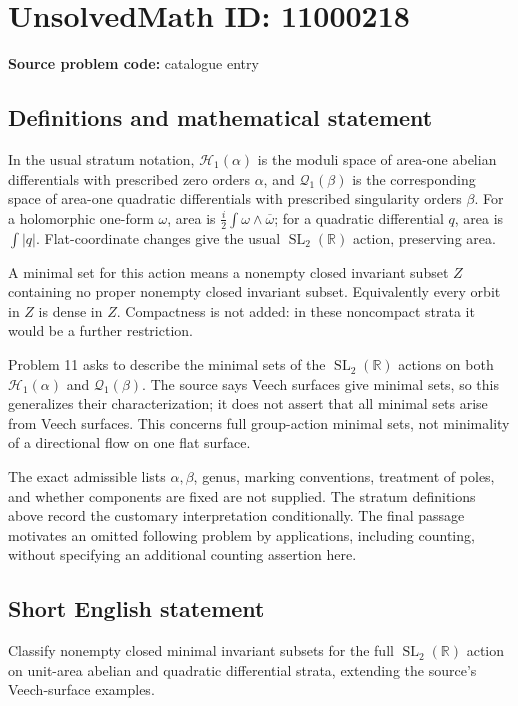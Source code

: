 \documentclass[11pt]{article}
\newcommand{\R}{\mathbb{R}}
\begin{document}
\section*{UnsolvedMath ID: 11000218}
\textbf{Source problem code:} catalogue entry
\subsection{Definitions and mathematical statement}
In the usual stratum notation, $\mathcal H_1(\alpha)$ is the moduli space of area-one abelian differentials with prescribed zero orders $\alpha$, and $\mathcal Q_1(\beta)$ is the corresponding space of area-one quadratic differentials with prescribed singularity orders $\beta$. For a holomorphic one-form $\omega$, area is $\tfrac i2\int\omega\wedge\overline\omega$; for a quadratic differential $q$, area is $\int|q|$. Flat-coordinate changes give the usual $\operatorname{SL}_2(\R)$ action, preserving area.

A minimal set for this action means a nonempty closed invariant subset $Z$ containing no proper nonempty closed invariant subset. Equivalently every orbit in $Z$ is dense in $Z$. Compactness is not added: in these noncompact strata it would be a further restriction.

Problem 11 asks to describe the minimal sets of the $\operatorname{SL}_2(\R)$ actions on both $\mathcal H_1(\alpha)$ and $\mathcal Q_1(\beta)$. The source says Veech surfaces give minimal sets, so this generalizes their characterization; it does not assert that all minimal sets arise from Veech surfaces. This concerns full group-action minimal sets, not minimality of a directional flow on one flat surface.

The exact admissible lists $\alpha,\beta$, genus, marking conventions, treatment of poles, and whether components are fixed are not supplied. The stratum definitions above record the customary interpretation conditionally. The final passage motivates an omitted following problem by applications, including counting, without specifying an additional counting assertion here.
\subsection{Short English statement}
Classify nonempty closed minimal invariant subsets for the full $\operatorname{SL}_2(\R)$ action on unit-area abelian and quadratic differential strata, extending the source's Veech-surface examples.
\end{document}
